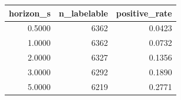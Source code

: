 \begin{tabular}{rrr}
\toprule
horizon\_s & n\_labelable & positive\_rate \\
\midrule
0.5000 & 6362 & 0.0423 \\
1.0000 & 6362 & 0.0732 \\
2.0000 & 6327 & 0.1356 \\
3.0000 & 6292 & 0.1890 \\
5.0000 & 6219 & 0.2771 \\
\bottomrule
\end{tabular}
